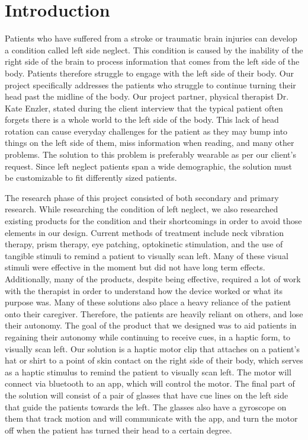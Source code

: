 \chapter{Introduction}
\label{chap:intro}


Patients who have suffered from a stroke or traumatic brain injuries can develop a condition called left side neglect. This condition is caused by the inability of the right side of the brain to process information that comes from the left side of the body. Patients therefore struggle to engage with the left side of their body. Our project specifically addresses the patients who struggle to continue turning their head past the midline of the body. Our project partner, physical therapist Dr. Kate Enzler, stated during the client interview that the typical patient often forgets there is a whole world to the left side of the body. This lack of head rotation can cause everyday challenges for the patient as they may bump into things on the left side of them, miss information when reading, and many other problems. The solution to this problem is preferably wearable as per our client’s request. Since left neglect patients span a wide demographic, the solution must be customizable to fit differently sized patients.

The research phase of this project consisted of both secondary and primary research. While researching the condition of left neglect, we also researched existing products for the condition and their shortcomings in order to avoid those elements in our design. Current methods of treatment include neck vibration therapy, prism therapy, eye patching, optokinetic stimulation, and the use of tangible stimuli to remind a patient to visually scan left. Many of these visual stimuli were effective in the moment but did not have long term effects. Additionally, many of the products, despite being effective, required a lot of work with the therapist in order to understand how the device worked or what its purpose was. Many of these solutions also place a heavy reliance of the patient onto their caregiver. Therefore, the patients are heavily reliant on others, and lose their autonomy. The goal of the product that we designed was to aid patients in regaining their autonomy while continuing to receive cues, in a haptic form, to visually scan left.  Our solution is a haptic motor clip that attaches on a patient's hat or shirt to a point of skin contact on the right side of their body, which serves as a haptic stimulus to remind the patient to visually scan left. The motor will connect via bluetooth to an app, which will control the motor. The final part of the solution will consist of a pair of glasses that have cue lines on the left side that guide the patients towards the left. The glasses also have a gyroscope on them that track motion and will communicate with the app, and turn the motor off when the patient has turned their head to a certain degree. 

